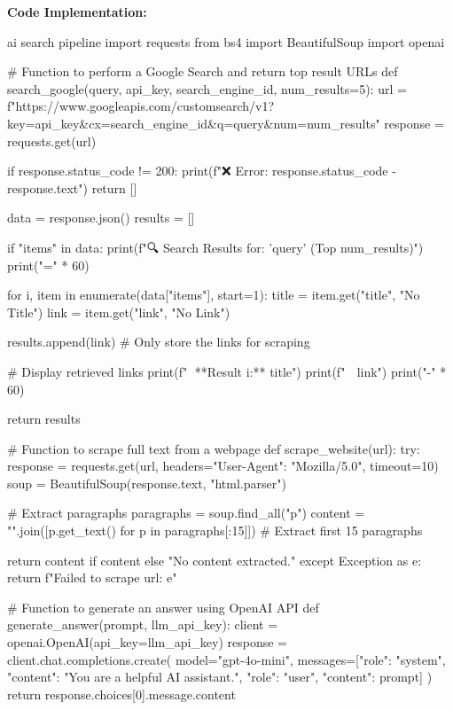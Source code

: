 \textbf{Code Implementation:}
\begin{codeonly}{ai search pipeline}
import requests
from bs4 import BeautifulSoup
import openai

# Function to perform a Google Search and return top result URLs
def search_google(query, api_key, search_engine_id, num_results=5):
    url = f"https://www.googleapis.com/customsearch/v1?key={api_key}&cx={search_engine_id}&q={query}&num={num_results}"
    response = requests.get(url)

    if response.status_code != 200:
        print(f"❌ Error: {response.status_code} - {response.text}")
        return []

    data = response.json()
    results = []

    if "items" in data:
        print(f"\n🔍 Search Results for: '{query}' (Top {num_results})")
        print("=" * 60)

        for i, item in enumerate(data["items"], start=1):
            title = item.get("title", "No Title")
            link = item.get("link", "No Link")

            results.append(link)  # Only store the links for scraping

            # Display retrieved links
            print(f"📌 **Result {i}:** {title}")
            print(f"   🔗 {link}")
            print("-" * 60)

    return results

# Function to scrape full text from a webpage
def scrape_website(url):
    try:
        response = requests.get(url, headers={"User-Agent": "Mozilla/5.0"}, timeout=10)
        soup = BeautifulSoup(response.text, "html.parser")

        # Extract paragraphs
        paragraphs = soup.find_all("p")
        content = "\n".join([p.get_text() for p in paragraphs[:15]])  # Extract first 15 paragraphs

        return content if content else "No content extracted."
    except Exception as e:
        return f"Failed to scrape {url}: {e}"

# Function to generate an answer using OpenAI API
def generate_answer(prompt, llm_api_key):
    client = openai.OpenAI(api_key=llm_api_key)
    response = client.chat.completions.create(
        model="gpt-4o-mini",
        messages=[{"role": "system", "content": "You are a helpful AI assistant."},
                  {"role": "user", "content": prompt}]
    )
    return response.choices[0].message.content


\end{codeonly}
